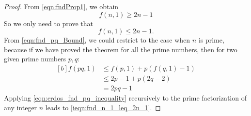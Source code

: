 \documentclass{article}
\theoremstyle{definition}
\numberwithin{equation}{theorem}
\numberwithin{figure}{theorem}
\newcommand{\fnd}[2]{\ensuremath{f(#1,#2)}}
\begin{document}
    \begin{proof}
        From \eqref{eqn:fndProp1}, we obtain 
        \begin{equation}\label{ieqn:fnd_n_1_get_2n_1}
            \fnd{n}{1} \geq 2 n - 1
        \end{equation}            
        So we only need to prove that 
        \begin{equation}\label{ieqn:fnd_n_1_leq_2n_1}
            \fnd{n}{1} \leq 2n - 1.
        \end{equation}            
        From \eqref{eqn:fnd_pq_Bound}, we could restrict to the case when $n$ is prime, 
        because if we have proved the theorem for all 
        the prime numbers,
        then for two given prime numbers $p,q$:
        \begin{equation}\label{eqn:erdos_fnd_pq_inequality}
        \begin{aligned}[b]
            \fnd{pq}{1} &\leq \fnd{p}{1} + p (\fnd{q}{1} - 1) \\
            &\leq 2 p - 1 + p (2 q - 2) \\
            &= 2pq - 1         
        \end{aligned}
        \end{equation}
        Applying \eqref{eqn:erdos_fnd_pq_inequality} recursively 
        to the prime factorization of any integer 
        $n$ leads to \eqref{ieqn:fnd_n_1_leq_2n_1}.
    

\end{proof}
\end{document}
